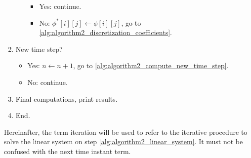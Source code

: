 \begin{algorithm}[ht]
\begin{algorithmic}[0]
\begin{enumerate}[label=\textbf{\arabic*},topsep=0pt]
\begin{enumerate}[label=\textbf{4.\arabic*}]
				\begin{itemize}
					\item Yes: continue.
					\item No: $\phi^\ast[i][j] \gets \phi[i][j]$, go to \ref{alg:algorithm2_discretization_coefficients}.
				\end{itemize}
			\end{enumerate}
			\item New time step?
			\begin{itemize}
				\item Yes: $n \gets n + 1$, go to \ref{alg:algorithm2_compute_new_time_step}.
				\item No: continue.
			\end{itemize}
			\item Final computations, print results.
			\item End.
		\end{enumerate}
	\end{algorithmic}
\end{algorithm}

Hereinafter, the term iteration will be used to refer to the iterative procedure to solve the linear system on step \ref{alg:algorithm2_linear_system}. It must not be confused with the next time instant term.

